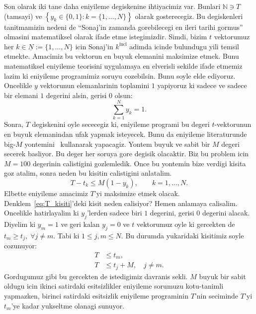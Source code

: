 Son olarak iki tane daha eniyileme degiskenine ihtiyacimiz var. Bunlari
$\mathbb{N} \ni T$ (tamsayi) ve $\left\{y_k \in \{0, 1\}:k = \{1, \ldots, N\}
\right\}$ olarak gosterecegiz. Bu degiskenleri tanitmamizin nedeni de ``Sonaj'in
zamanda gorebilecegi en ileri tarihi gormus'' olmasini matematiksel olarak ifade
etme istegimizdir. Simdi, bizim $t$ vektorumuz her $k \in \underline{N} := \{1,
\ldots, N\}$ icin Sonaj'in $k^{\text{inci}}$ adimda icinde bulundugu yili temsil
etmekte. Amacimiz bu vektorun en buyuk elemanini maksimize etmek. Bunu
matematiksel eniyileme teorisini uygulamaya en elverisli sekilde ifade etmemiz
lazim ki eniyileme programimiz soruyu cozebilsin. Bunu soyle elde ediyoruz.
Oncelikle $y$ vektorunun elemanlarinin toplamini $1$ yapiyoruz ki sadece ve
sadece bir elemani $1$ degerini alsin, gerisi $0$ olsun: 
\begin{equation}
    \sum_{k=1}^N y_k = 1. 
    \label{eq:constraints_y}
\end{equation}
%
Sonra, $T$ degiskenini oyle sececegiz ki, eniyileme programi bu degeri
$t$-vektorunun en buyuk elemanindan ufak yapmak isteyecek. Bunu da eniyileme
literaturunde big-$M$ yontemini~\citep{griva2009linear,wiki:Big_M_method}
kullanarak yapacagiz. Yontem buyuk ve sabit bir $M$ degeri secerek basliyor. Bu
deger her soruya gore degisik olacaktir. Biz bu problem icin $M=100$ degerinin
calistigini gozlemledik. Once bu yontemin bize verdigi kisita goz atalim, sonra
neden bu kisitin calistigini anlatalim.
%
\begin{equation}
    T - t_k \leq M\left( 1 - y_k \right), \qquad k = 1, \ldots, N.
    \label{eq:T_kisiti}
\end{equation}
%
Elbette eniyileme amacimiz $T$'yi maksimize etmek olacak.
Denklem~\eqref{eq:T_kisiti}'deki kisit neden calisiyor? Hemen anlamaya
calisalim. Oncelikle hatirlayalim ki $y_j$'lerden sadece biri $1$ degerini,
gerisi $0$ degerini alacak. Diyelim ki $y_m = 1$ ve geri kalan $y_j = 0$ ve $t$
vektorumuz oyle ki gercekten de $t_m \geq t_j, \; \forall j \neq m$. Tabi ki $1
\leq j, m \leq N$. Bu durumda yukaridaki kisitimiz soyle cozunuyor:
%
\begin{align*}
    T &\leq t_m, \\
    T &\leq t_j + M, \quad j \neq m.
\end{align*}
%
Gordugumuz gibi bu gercekten de istedigimiz davranis sekli. $M$ buyuk bir sabit
oldugu icin ikinci satirdaki esitsizlikler eniyileme sorumuzu kotu-tanimli
yapmazken, birinci satirdaki esitsizlik eniyileme programinin $T$'nin seciminde
$T$'yi $t_m$'ye kadar yukseltme olanagi sunuyor. 

